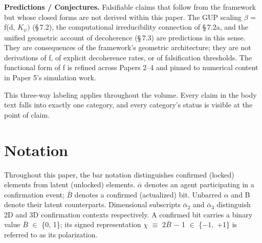 \documentclass[11pt,oneside]{report}
\theoremstyle{definition}
\theoremstyle{remark}
\begin{document}
\textbf{Predictions / Conjectures.} Falsifiable claims that follow from
the framework but whose closed forms are not derived within this paper.
The GUP scaling \ensuremath{\beta} = f(d, \ensuremath{K_{\psi})} (\S\,7.2), the computational irreducibility
connection of \S\,7.2a, and the unified geometric account of decoherence
(\S\,7.3) are predictions in this sense. They are consequences of the
framework's geometric architecture; they are not derivations of f, of
explicit decoherence rates, or of falsification thresholds. The
functional form of f is refined across Papers 2--4 and pinned to
numerical content in Paper 5's simulation work.

This three-way labeling applies throughout the volume. Every claim in
the body text falls into exactly one category, and every category's
status is visible at the point of claim.

\section*{Notation}

Throughout this paper, the bar notation distinguishes confirmed (locked)
elements from latent (unlocked) elements. \ensuremath{\bar{\alpha}} denotes an agent
participating in a confirmation event; \ensuremath{\bar{B}} denotes a confirmed
(actualized) bit. Unbarred \ensuremath{\alpha} and B denote their latent counterparts.
Dimensional subscripts \ensuremath{\bar{\alpha}_{2}} and \ensuremath{\bar{\alpha}_{3}} distinguish 2D and 3D confirmation
contexts respectively. A confirmed bit carries a binary value \ensuremath{\bar{B}} \ensuremath{\in} \{0,
1\}; its signed representation \ensuremath{\chi} \ensuremath{\equiv} \ensuremath{2\bar{B}} \ensuremath{-} 1 \ensuremath{\in} \{\ensuremath{-1,} +1\} is referred to as
its polarization.
\end{document}
